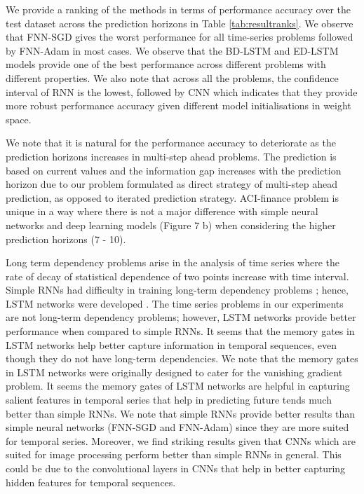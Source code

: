 \documentclass{ieeeaccess}
\begin{document}
 

We provide a ranking of the methods in terms of performance accuracy over the test dataset across the prediction horizons in Table \ref{tab:resultranks}. We observe that FNN-SGD gives the worst performance for all time-series problems followed by FNN-Adam in most cases.   We observe that the BD-LSTM and ED-LSTM models provide one of the best performance across different problems with different properties. We also note that   across all the problems, the confidence interval of RNN is the lowest, followed by CNN which indicates that they provide more robust performance accuracy given different model initialisations in weight space.
 
  We note that it is natural for the performance accuracy  to deteriorate as the prediction horizons increases in multi-step ahead problems. The prediction is based on current values and the information gap   increases with  the prediction horizon due to our problem formulated as direct strategy of multi-step ahead prediction, as opposed to iterated prediction strategy. ACI-finance problem is  unique in  a way where there is not a major difference with simple neural networks and deep learning models (Figure 7 b) when considering the higher prediction horizons (7 - 10). 
  
 
 Long term dependency problems  arise in the analysis of   time series where  the rate of decay of statistical dependence of two points increase with  time interval. Simple RNNs had difficulty in training   long-term dependency problems \cite{hochreiter1998vanishing}; hence, LSTM networks were developed \cite{hochreiter1997long}. The time series  problems in our experiments  are not long-term dependency problems; however, LSTM networks provide better performance  when compared to  simple RNNs. It seems that  the memory gates in LSTM networks help better capture information in temporal sequences, even though they do not have  long-term dependencies. We note that the memory gates in LSTM networks were originally designed to cater for the vanishing gradient problem. It seems the memory gates of LSTM networks are helpful in capturing salient features in temporal series that help in predicting future tends much better than simple RNNs. We note that simple RNNs provide better results than simple neural networks (FNN-SGD and FNN-Adam) since they are more suited for temporal series. Moreover, we find striking results given that CNNs which are suited for image processing  perform better than simple RNNs in general. This could be due to the convolutional layers in CNNs that help in better capturing hidden features for  temporal sequences. 
  
\end{document}
